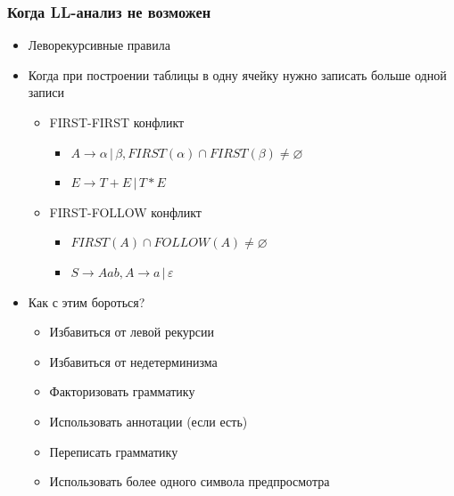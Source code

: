 \documentclass{beamer}
\begin{document}
\begin{frame}[fragile]
  \transwipe[direction=90]
  \frametitle{Когда LL-анализ не возможен}
  \begin{itemize}
    \item Леворекурсивные правила
    \item Когда при построении таблицы в одну ячейку нужно записать больше одной записи
    \begin{itemize}
      \item FIRST-FIRST конфликт
      \begin{itemize}
        \item $A \rightarrow \alpha \, | \, \beta, FIRST(\alpha) \cap FIRST(\beta) \neq \varnothing $ 
        \item $E \rightarrow T + E \, | \, T * E$
      \end{itemize}
      \item FIRST-FOLLOW конфликт
      \begin{itemize}
        \item $FIRST(A) \cap FOLLOW(A) \neq \varnothing$
        \item $S \rightarrow A a b, A \rightarrow a \, | \, \varepsilon$
      \end{itemize}
    \end{itemize} 
    \item Как с этим бороться? 
    \begin{itemize}
      \item Избавиться от левой рекурсии
      \item Избавиться от недетерминизма
      \item Факторизовать грамматику
      \item Использовать аннотации (если есть)
      \item Переписать грамматику
      \item Использовать более одного символа предпросмотра
    \end{itemize}
  \end{itemize}
\end{frame} 
\end{document}
